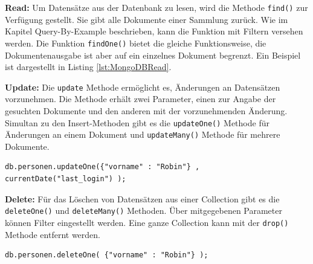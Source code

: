 \noindent
{}
\textbf{Read:}
Um Datensätze aus der Datenbank zu lesen, wird die Methode  \texttt{find()} zur Verfügung gestellt. Sie gibt alle Dokumente einer Sammlung zurück. Wie im Kapitel Query-By-Example beschrieben, kann die Funktion mit Filtern versehen werden. Die Funktion \texttt{findOne()} bietet die gleiche Funktionsweise, die Dokumentenausgabe ist aber auf ein einzelnes Dokument begrenzt.
Ein Beispiel ist dargestellt in Listing \ref{lst:MongoDBRead}.
\newline\newline

\noindent
{}
\textbf{Update:}
Die \texttt{update} Methode ermöglicht es, Änderungen an Datensätzen vorzunehmen.  Die Methode erhält zwei Parameter, einen zur Angabe der gesuchten Dokumente und den anderen mit  der vorzunehmenden Änderung. Simultan zu den Insert-Methoden gibt es die \texttt{updateOne()} Methode für Änderungen an einem Dokument und \texttt{updateMany()} Methode für mehrere Dokumente.
\newline

\begin{lstlisting}[caption=MongoDB Update, label=lst:MongoDBUpdate]
db.personen.updateOne({"vorname" : "Robin"} , currentDate("last_login") );

\end{lstlisting}

\noindent
{}
\textbf{Delete:}
Für das Löschen von Datensätzen aus einer Collection gibt es die \texttt{deleteOne()} und \texttt{deleteMany()} Methoden. Über mitgegebenen Parameter können Filter eingestellt werden. Eine ganze Collection kann mit der \texttt{drop()}  Methode entfernt werden.
\newline

\begin{lstlisting}[caption=MongoDB Remove, label=lst:MongoDBRemove]
db.personen.deleteOne( {"vorname" : "Robin"} );

\end{lstlisting}

\noindent

